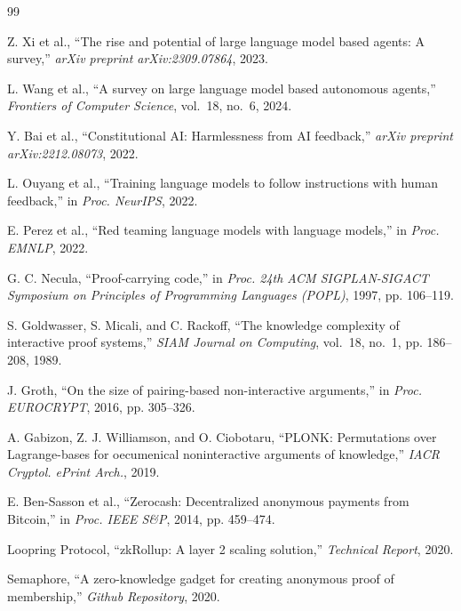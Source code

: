 \documentclass[10pt,conference]{IEEEtran}
\begin{document}

\begin{thebibliography}{99}

Z. Xi et al., ``The rise and potential of large language model based agents: A survey,'' \textit{arXiv preprint arXiv:2309.07864}, 2023.

L. Wang et al., ``A survey on large language model based autonomous agents,'' \textit{Frontiers of Computer Science}, vol.~18, no.~6, 2024.

Y. Bai et al., ``Constitutional AI: Harmlessness from AI feedback,'' \textit{arXiv preprint arXiv:2212.08073}, 2022.

L. Ouyang et al., ``Training language models to follow instructions with human feedback,'' in \textit{Proc. NeurIPS}, 2022.

E. Perez et al., ``Red teaming language models with language models,'' in \textit{Proc. EMNLP}, 2022.

G. C. Necula, ``Proof-carrying code,'' in \textit{Proc. 24th ACM SIGPLAN-SIGACT Symposium on Principles of Programming Languages (POPL)}, 1997, pp. 106--119.

S. Goldwasser, S. Micali, and C. Rackoff, ``The knowledge complexity of interactive proof systems,'' \textit{SIAM Journal on Computing}, vol.~18, no.~1, pp. 186--208, 1989.

J. Groth, ``On the size of pairing-based non-interactive arguments,'' in \textit{Proc. EUROCRYPT}, 2016, pp. 305--326.

A. Gabizon, Z. J. Williamson, and O. Ciobotaru, ``PLONK: Permutations over Lagrange-bases for oecumenical noninteractive arguments of knowledge,'' \textit{IACR Cryptol. ePrint Arch.}, 2019.

E. Ben-Sasson et al., ``Zerocash: Decentralized anonymous payments from Bitcoin,'' in \textit{Proc. IEEE S\&P}, 2014, pp. 459--474.

Loopring Protocol, ``zkRollup: A layer 2 scaling solution,'' \textit{Technical Report}, 2020.

Semaphore, ``A zero-knowledge gadget for creating anonymous proof of membership,'' \textit{Github Repository}, 2020.


\end{thebibliography}
\end{document}
